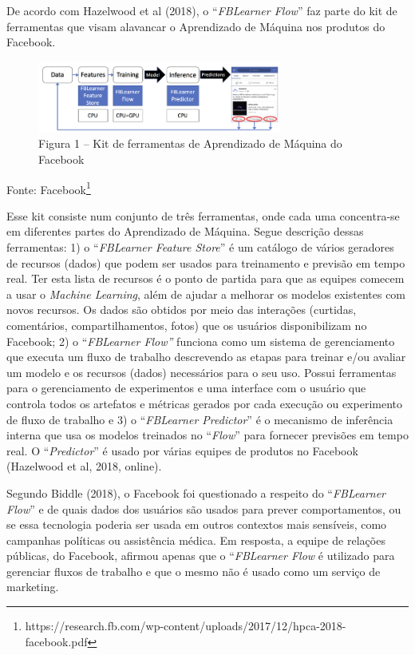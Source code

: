 De acordo com Hazelwood et al (2018), o ``\emph{FBLearner Flow}'' faz
parte do kit de ferramentas que visam alavancar o Aprendizado de Máquina
nos produtos do Facebook.

\begin{figure}[!ht]
\centering
  \includegraphics[width=80mm]{./imgs/grafico3.png}
\caption{Figura 1 -- Kit de ferramentas de Aprendizado de Máquina do Facebook}
 \end{figure}

Fonte: Facebook\footnote{https://research.fb.com/wp-content/uploads/2017/12/hpca-2018-facebook.pdf}

Esse kit consiste num conjunto de três ferramentas, onde cada uma
concentra-se em diferentes partes do Aprendizado de Máquina. Segue
descrição dessas ferramentas: 1) o ``\emph{FBLearner Feature Store}'' é
um catálogo de vários geradores de recursos (dados) que podem ser usados
para treinamento e previsão em tempo real. Ter esta lista de recursos é
o ponto de partida para que as equipes comecem a usar o \emph{Machine
Learning}, além de ajudar a melhorar os modelos existentes com novos
recursos. Os dados são obtidos por meio das interações (curtidas,
comentários, compartilhamentos, fotos) que os usuários disponibilizam no
Facebook; 2) o ``\emph{FBLearner Flow''} funciona como um sistema de
gerenciamento que executa um fluxo de trabalho descrevendo as etapas
para treinar e/ou avaliar um modelo e os recursos (dados) necessários
para o seu uso. Possui ferramentas para o gerenciamento de experimentos
e uma interface com o usuário que controla todos os artefatos e métricas
gerados por cada execução ou experimento de fluxo de trabalho e 3) o
``\emph{FBLearner Predictor}'' é o mecanismo de inferência interna que
usa os modelos treinados no ``\emph{Flow}'' para fornecer previsões em
tempo real. O ``\emph{Predictor}'' é usado por várias equipes de
produtos no Facebook (Hazelwood et al, 2018, online).

Segundo Biddle (2018), o Facebook foi questionado a respeito do
``\emph{FBLearner Flow}'' e de quais dados dos usuários são usados para
prever comportamentos, ou se essa tecnologia poderia ser usada em outros
contextos mais sensíveis, como campanhas políticas ou assistência
médica. Em resposta, a equipe de relações públicas, do Facebook, afirmou
apenas que o ``\emph{FBLearner Flow} é utilizado para gerenciar fluxos
de trabalho e que o mesmo não é usado como um serviço de marketing.

